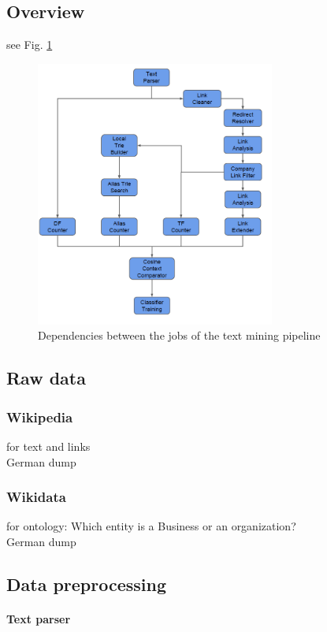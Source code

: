 \documentclass[
        a4paper,     %
        titlepage,   %
        twoside,     %
        parskip      %
        ]{scrartcl} %
\begin{document}
\subsection{Overview}
see Fig. \ref{fig:job_dependencies}
\begin{figure}[ht]
	\centering
  \includegraphics[width=0.7\textwidth]{job_dependencies.png}
	\caption{Dependencies between the jobs of the text mining pipeline}
	\label{fig:job_dependencies}
\end{figure}

\subsection{Raw data}
\subsubsection{Wikipedia}
for text and links\\
German dump

\subsubsection{Wikidata}
for ontology: Which entity is a Business or an organization?\\
German dump

\subsection{Data preprocessing}

\paragraph{Text parser}
\end{document}
